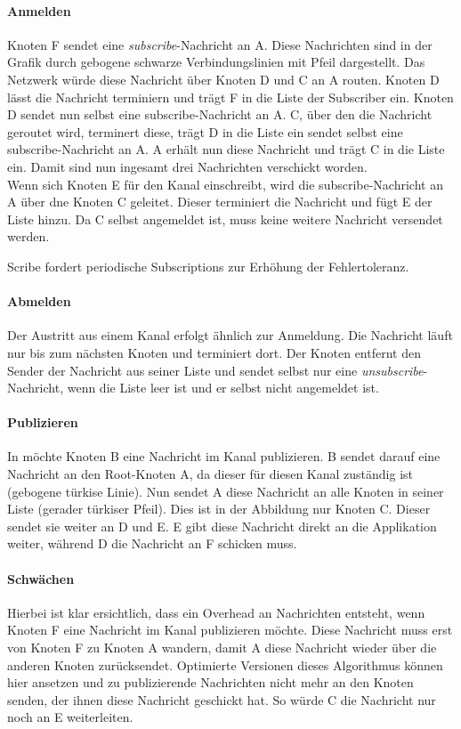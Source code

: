 \paragraph*{Anmelden}
Knoten F sendet eine \emph{subscribe}-Nachricht an A. Diese Nachrichten sind in der Grafik durch gebogene schwarze Verbindungslinien mit Pfeil dargestellt. Das Netzwerk würde diese Nachricht über Knoten D und C an A routen. Knoten D lässt die Nachricht terminiern und trägt F in die Liste der Subscriber ein. Knoten D sendet nun selbst eine subscribe-Nachricht an A. C, über den die Nachricht geroutet wird, terminert diese, trägt D in die Liste ein sendet selbst eine subscribe-Nachricht an A. A erhält nun diese Nachricht und trägt C in die Liste ein. Damit sind nun ingesamt drei Nachrichten verschickt worden.\\
Wenn sich Knoten E für den Kanal einschreibt, wird die subscribe-Nachricht an A über dne Knoten C geleitet. Dieser terminiert die Nachricht und fügt E der Liste hinzu. Da C selbst angemeldet ist, muss keine weitere Nachricht versendet werden.

Scribe fordert periodische Subscriptions zur Erhöhung der Fehlertoleranz.

\paragraph*{Abmelden}
Der Austritt aus einem Kanal erfolgt ähnlich zur Anmeldung. Die Nachricht läuft nur bis zum nächsten Knoten und terminiert dort. Der Knoten entfernt den Sender der Nachricht aus seiner Liste und sendet selbst nur eine \emph{unsubscribe}-Nachricht, wenn die Liste leer ist und er selbst nicht angemeldet ist.

\paragraph*{Publizieren}
In  möchte Knoten B eine Nachricht im Kanal publizieren. B sendet darauf eine Nachricht an den Root-Knoten A, da dieser für diesen Kanal zuständig ist (gebogene türkise Linie). Nun sendet A diese Nachricht an alle Knoten in seiner Liste (gerader türkiser Pfeil). Dies ist in der Abbildung nur Knoten C. Dieser sendet sie weiter an D und E. E gibt diese Nachricht direkt an die Applikation weiter, während D die Nachricht an F schicken muss.


\paragraph*{Schwächen}
Hierbei ist klar ersichtlich, dass ein Overhead an Nachrichten entsteht, wenn Knoten F eine Nachricht im Kanal publizieren möchte. Diese Nachricht muss erst von Knoten F zu Knoten A wandern, damit A diese Nachricht wieder über die anderen Knoten zurücksendet. Optimierte Versionen dieses Algorithmus können hier ansetzen und zu publizierende Nachrichten nicht mehr an den Knoten senden, der ihnen diese Nachricht geschickt hat. So würde C die Nachricht nur noch an E weiterleiten.

